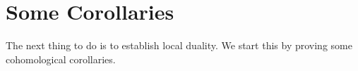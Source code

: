 
%
%




\newcommand{\category}[1]{\textsf{#1}}









\title{}
\author{Jack J Garzella}




\section{Some Corollaries}


The next thing to do is to establish local duality. 
We start this by proving some cohomological corollaries.  

